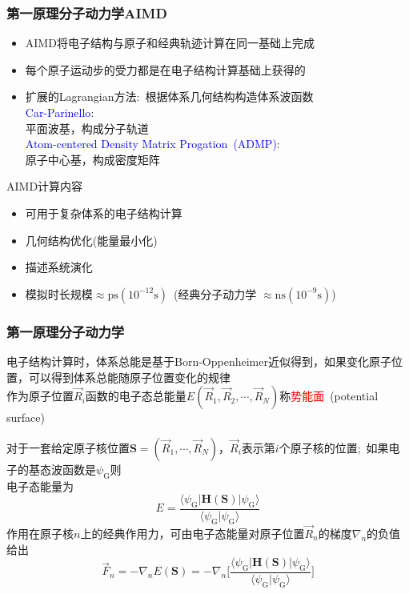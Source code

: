 \frame
{
	\frametitle{第一原理分子动力学\textrm{AIMD}}
	\begin{itemize}
		\item \textrm{AIMD}将电子结构与原子和经典轨迹计算在同一基础上完成
		\item 每个原子运动步的受力都是在电子结构计算基础上获得的
		\item 扩展的\textrm{Lagrangian}方法:~根据体系几何结构构造体系波函数\\
			\textcolor{blue}{\textrm{Car-Parinello}}:\\
			平面波基，构成分子轨道\\
			\textcolor{blue}{\textrm{Atom-centered Density Matrix Progation~(ADMP)}}:\\
			原子中心基，构成密度矩阵
	\end{itemize}
	\textrm{AIMD}计算内容
	\begin{itemize}
		\item 可用于复杂体系的电子结构计算
		\item 几何结构优化(能量最小化)
		\item 描述系统演化
		\item 模拟时长规模$\approx{\mathrm{ps}}(10^{-12}\mathrm{s})$~(经典分子动力学 $\approx\mathrm{ns}(10^{-9}\mathrm{s})$)
	\end{itemize}
}


\frame
{
	\frametitle{第一原理分子动力学}
	电子结构计算时，体系总能是基于\textrm{Born-Oppenheimer}近似得到，如果变化原子位置，可以得到体系总能随原子位置变化的规律\\
	作为原子位置$\vec R_i$函数的电子态总能量$E(\vec R_1,\vec R_2,\cdots,\vec R_N)$称\textcolor{red}{势能面}~(\textrm{potential surface})

	对于一套给定原子核位置$\mathbf{S}=(\vec R_1,\cdots,\vec R_N)$，$\vec R_i$表示第$i$个原子核的位置;~如果电子的基态波函数是$\psi_{\mathrm{G}}$则\\电子态能量为
	\begin{displaymath}
		E=\dfrac{\langle\psi_{\mathrm{G}}|\mathbf{H}(\mathbf{S})|\psi_{\mathrm{G}}\rangle}{\langle\psi_{\mathrm{G}}|\psi_{\mathrm{G}}\rangle}
	\end{displaymath}
作用在原子核$n$上的经典作用力，可由电子态能量对原子位置$\vec R_n$的梯度$\nabla_n$的负值给出
\begin{displaymath}
	\vec F_n=-\nabla_nE(\mathbf{S})=-\nabla_n\bigg[\dfrac{\langle\psi_{\mathrm{G}}|\mathbf{H}(\mathbf{S})|\psi_{\mathrm{G}}\rangle}{\langle\psi_{\mathrm{G}}|\psi_{\mathrm{G}}\rangle}\bigg]
\end{displaymath}
}

